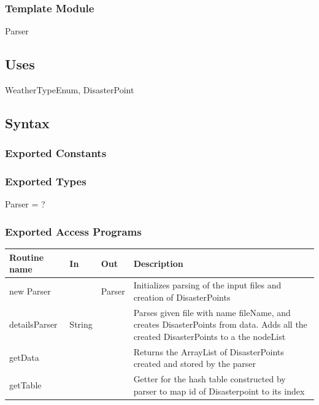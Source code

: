 \documentclass[12pt]{article}
\begin{document}
                \subsubsection*{Template Module}
                
                Parser
                
                \subsection* {Uses}
                
                WeatherTypeEnum, DisasterPoint
                
                \subsection* {Syntax}
                
                \subsubsection*{Exported Constants}
                
                \subsubsection* {Exported Types}
                
                Parser = ?
                
                \subsubsection* {Exported Access Programs}
                \tabcolsep=0.05cm
                \begin{tabular}{| l | l | l | p{11cm} |}
                \hline
                \textbf{Routine name} & \textbf{In} & \textbf{Out} & \textbf{Description}\\
                \hline
                new Parser & ~ & Parser & Initializes parsing of the input files and creation of DisasterPoints\\
                \hline
                detailsParser & String & ~ & Parses given file with name fileName, and creates DisasterPoints from data. Adds all the created DisasterPoints to a the nodeList\\
                \hline
                getData & ~ & ~ & Returns the ArrayList of DisasterPoints created and stored by the parser\\
                \hline
                getTable & ~ & ~ & Getter for the hash table constructed by parser to map id of Disasterpoint to its index\\
                \hline
                \end{tabular}
                
\end{document}
